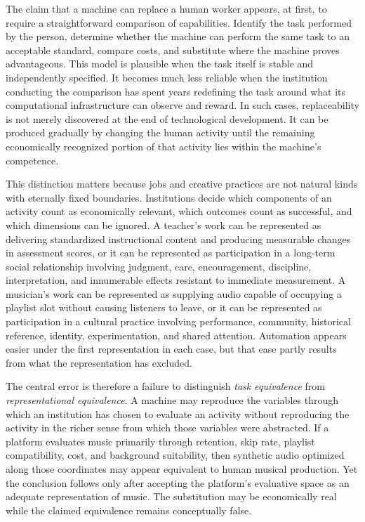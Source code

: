 \documentclass[11pt]{article}
\begin{document}
The claim that a machine can replace a human worker appears, at first, to require a straightforward comparison of capabilities. Identify the task performed by the person, determine whether the machine can perform the same task to an acceptable standard, compare costs, and substitute where the machine proves advantageous. This model is plausible when the task itself is stable and independently specified. It becomes much less reliable when the institution conducting the comparison has spent years redefining the task around what its computational infrastructure can observe and reward. In such cases, replaceability is not merely discovered at the end of technological development. It can be produced gradually by changing the human activity until the remaining economically recognized portion of that activity lies within the machine's competence.

This distinction matters because jobs and creative practices are not natural kinds with eternally fixed boundaries. Institutions decide which components of an activity count as economically relevant, which outcomes count as successful, and which dimensions can be ignored. A teacher's work can be represented as delivering standardized instructional content and producing measurable changes in assessment scores, or it can be represented as participation in a long-term social relationship involving judgment, care, encouragement, discipline, interpretation, and innumerable effects resistant to immediate measurement. A musician's work can be represented as supplying audio capable of occupying a playlist slot without causing listeners to leave, or it can be represented as participation in a cultural practice involving performance, community, historical reference, identity, experimentation, and shared attention. Automation appears easier under the first representation in each case, but that ease partly results from what the representation has excluded.

The central error is therefore a failure to distinguish \emph{task equivalence} from \emph{representational equivalence}. A machine may reproduce the variables through which an institution has chosen to evaluate an activity without reproducing the activity in the richer sense from which those variables were abstracted. If a platform evaluates music primarily through retention, skip rate, playlist compatibility, cost, and background suitability, then synthetic audio optimized along those coordinates may appear equivalent to human musical production. Yet the conclusion follows only after accepting the platform's evaluative space as an adequate representation of music. The substitution may be economically real while the claimed equivalence remains conceptually false.
\end{document}
